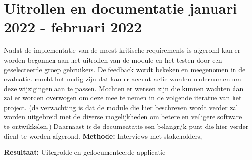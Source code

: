\section{Uitrollen en documentatie \textbf{januari 2022 - februari 2022 }}\label{sec:uitrollen-en-documentatie}
Nadat de implementatie van de meest kritische requirements is afgerond kan er worden begonnen aan het uitrollen van de module en het testen door een geselecteerde groep gebruikers. De feedback wordt bekeken en meegenomen in de evaluatie. mocht het nodig zijn dat kan er accuut actie worden ondernomen om deze wijzigingen aan te passen. Mochten er wensen zijn die kunnen wachten dan zal er worden overwogen om deze mee te nemen in de volgende iteratue van het project. (de verwachting is dat de module die hier beschreven wordt verder zal worden uitgebreid met de diverse mogelijkheden om betere en veiligere software te ontwikkelen.) Daarnaast is de documentatie een belangrijk punt die hier verder dient te worden afgerond.
\textbf{Methode:} Interviews met stakeholders,

\textbf{Resultaat:} Uitegrolde en gedocumenteerde applicatie
